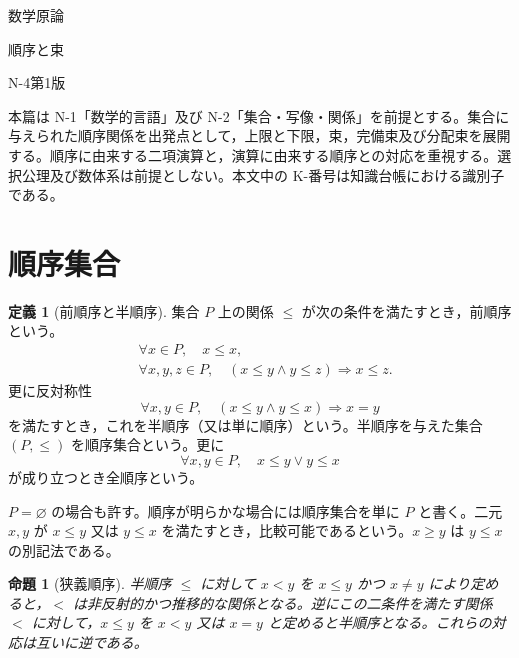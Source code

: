 \documentclass[a5paper,10pt,dvipdfmx]{jsarticle}
\theoremstyle{definition}
\newtheorem{defn}[ruledef]{定義}
\theoremstyle{plain}
\newtheorem{prop}[ruledef]{命題}
\newcommand{\impc}{\Longrightarrow}
\begin{document}
\begin{center}
{\small 数学原論}\par\vspace{4mm}
{\LARGE 順序と束}\par\vspace{2mm}
{\small N-4\quad 第1版}
\end{center}
\noindent 本篇は N-1「数学的言語」及び N-2「集合・写像・関係」を前提とする。集合に与えられた順序関係を出発点として，上限と下限，束，完備束及び分配束を展開する。順序に由来する二項演算と，演算に由来する順序との対応を重視する。選択公理及び数体系は前提としない。本文中の K-番号は知識台帳における識別子である。
\section{順序集合}
\begin{defn}[前順序と半順序]\label{k68}
集合 $P$ 上の関係 $\leq$ が次の条件を満たすとき，前順序という。
\begin{align*}
 &\forall x\in P,\quad x\leq x,\\
 &\forall x,y,z\in P,\quad (x\leq y\land y\leq z)\impc x\leq z.
\end{align*}
更に反対称性
\[
 \forall x,y\in P,\quad (x\leq y\land y\leq x)\impc x=y
\]
を満たすとき，これを半順序（又は単に順序）という。半順序を与えた集合 $(P,\leq)$ を順序集合という。更に
\[
 \forall x,y\in P,\quad x\leq y\lor y\leq x
\]
が成り立つとき全順序という。
\end{defn}
$P=\varnothing$ の場合も許す。順序が明らかな場合には順序集合を単に $P$ と書く。二元 $x,y$ が $x\leq y$ 又は $y\leq x$ を満たすとき，比較可能であるという。$x\geq y$ は $y\leq x$ の別記法である。
\begin{prop}[狭義順序]\label{k69}
半順序 $\leq$ に対して $x<y$ を $x\leq y$ かつ $x\ne y$ により定めると，$<$ は非反射的かつ推移的な関係となる。逆にこの二条件を満たす関係 $<$ に対して，$x\leq y$ を $x<y$ 又は $x=y$ と定めると半順序となる。これらの対応は互いに逆である。
\end{prop}
\end{document}
